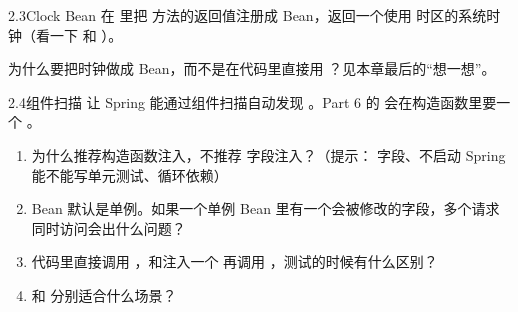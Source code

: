 \begin{task}{2.3\quad Clock Bean}
在  里把  方法的返回值注册成 Bean，返回一个使用  时区的系统时钟（看一下  和 ）。

为什么要把时钟做成 Bean，而不是在代码里直接用 ？见本章最后的“想一想”。
\end{task}

\begin{task}{2.4\quad 组件扫描}
让 Spring 能通过组件扫描自动发现 。Part 6 的  会在构造函数里要一个 。
\end{task}

\begin{think}
\begin{enumerate}
  \item 为什么推荐构造函数注入，不推荐  字段注入？（提示： 字段、不启动 Spring 能不能写单元测试、循环依赖）
  \item Bean 默认是单例。如果一个单例 Bean 里有一个会被修改的字段，多个请求同时访问会出什么问题？
  \item 代码里直接调用 ，和注入一个  再调用 ，测试的时候有什么区别？
  \item {} 和  分别适合什么场景？
\end{enumerate}
\end{think}
